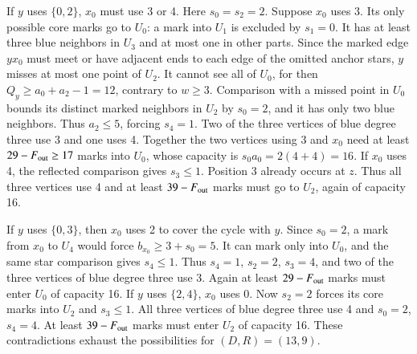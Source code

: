 

If $y$ uses $\{0,2\}$, $x_0$ must use 3 or 4. Here $s_0=s_2=2$.
Suppose $x_0$ uses 3. Its only possible core marks go to $U_0$:
a mark into $U_1$ is excluded by $s_1=0$. It has at least three
blue neighbors in $U_3$ and at most one in other parts. Since the
marked edge $yx_0$ must meet or have adjacent ends to each edge of
the omitted anchor stars, $y$ misses at most one point of $U_2$.
It cannot see all of $U_0$, for then $Q_y\ge a_0+a_2-1=12$,
contrary to $w\ge3$. Comparison with a missed point in $U_0$
bounds its distinct marked neighbors in $U_2$ by $s_0=2$, and it
has only two blue neighbors. Thus $a_2\le5$, forcing $s_4=1$.
Two of the three vertices of blue degree three use 3 and one uses 4.
Together the two vertices using 3 and $x_0$ need at least
$29-F_{\rm out}\ge17$ marks into $U_0$, whose capacity is
$s_0a_0=2(4+4)=16$. If $x_0$ uses 4, the reflected comparison
gives $s_3\le1$. Position 3 already occurs at $z$. Thus all three
vertices use 4 and at least $39-F_{\rm out}$ marks must go to $U_2$,
again of capacity 16.

If $y$ uses $\{0,3\}$, then $x_0$ uses 2 to cover the cycle with
$y$. Since $s_0=2$, a mark from $x_0$ to $U_4$ would force
$b_{x_0}\ge3+s_0=5$. It can mark only into $U_0$, and the same
star comparison gives $s_4\le1$. Thus $s_4=1$, $s_2=2$, $s_3=4$,
and two of the three vertices of blue degree three use 3. Again
at least $29-F_{\rm out}$ marks must enter $U_0$ of capacity 16.
If $y$ uses $\{2,4\}$, $x_0$ uses 0. Now $s_2=2$ forces its
core marks into $U_2$ and $s_3\le1$. All three vertices of blue
degree three use 4 and $s_0=2$, $s_4=4$. At least $39-F_{\rm out}$
marks must enter $U_2$ of capacity 16. These contradictions exhaust
the possibilities for $(D,R)=(13,9)$.
